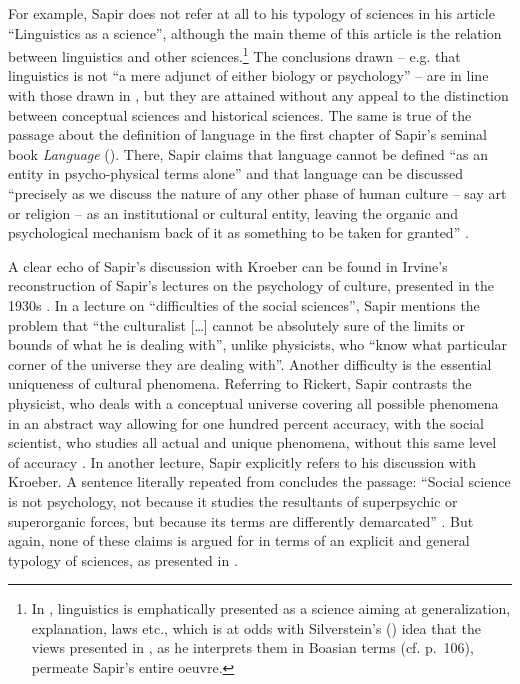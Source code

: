 \documentclass[output=paper]{langscibook}
\begin{document}
For example, Sapir does not refer at all to his typology of sciences in his \citeyear{Sapir1929} article ``Linguistics as a science'', although the main theme of this article is the relation between linguistics and other sciences.\footnote{In \citet{Sapir1929}, linguistics is emphatically presented as a science aiming at generalization, explanation, laws etc., which is at odds with Silverstein’s (\citeyear{Silverstein1986}) idea that the views presented in \citet{Sapir1917}, as he interprets them in Boasian terms (cf. p.~106), permeate Sapir's entire oeuvre.}  The conclusions drawn -- e.g. that linguistics is not ``a mere adjunct of either biology or psychology'' \citep[214]{Sapir1929} -- are in line with those drawn in \citeyear{Sapir1917}, but they are attained without any appeal to the distinction between conceptual sciences and historical sciences. The same is true of the passage about the definition of language in the first chapter of Sapir's seminal book \emph{Language} (\citeyear{Sapir1921}). There, Sapir claims that language cannot be defined ``as an entity in psycho-physical terms alone'' and that language can be discussed ``precisely as we discuss the nature of any other phase of human culture -- say art or religion -- as an institutional or cultural entity, leaving the organic and psychological mechanism back of it as something to be taken for granted'' \citep[10--11]{Sapir1921}.\label{q:elffers:huminst}

A clear echo of Sapir's discussion with Kroeber can be found in Irvine's reconstruction of Sapir's lectures on the psychology of culture, presented in the 1930s \citep{Sapir2002}. In a lecture on ``difficulties of the social sciences'', Sapir mentions the problem that ``the culturalist […] cannot be absolutely sure of the limits or bounds of what he is dealing with'', unlike physicists, who ``know what particular corner of the universe they are dealing with''. Another difficulty is the essential uniqueness of cultural phenomena. Referring to Rickert, Sapir contrasts the physicist, who deals with a conceptual universe covering all possible phenomena in an abstract way allowing for one hundred percent accuracy, with the social scientist, who studies all actual and unique phenomena, without this same level of accuracy \citep[56--57]{Sapir2002}. In another lecture, Sapir explicitly refers to his discussion with Kroeber. A sentence literally repeated from \citet[444]{Sapir1917} concludes the passage: ``Social science is not psychology, not because it studies the resultants of superpsychic or superorganic forces, but because its terms are differently demarcated'' \citep[245]{Sapir2002}. But again, none of these claims is argued for in terms of an explicit and general typology of sciences, as presented in \citet{Sapir1917}.
\end{document}
